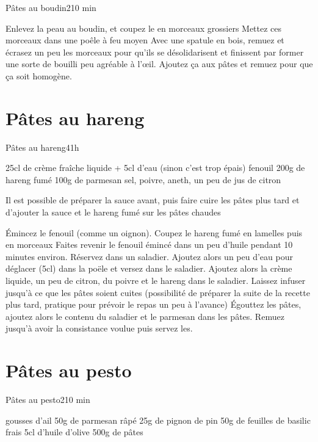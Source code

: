 {\begin{recette}{Pâtes au boudin}{2}{10 min}{}
\begin{preparation}
\etape Enlevez la peau au boudin, et coupez le en morceaux grossiers
\etape Mettez ces morceaux dans une poêle à feu moyen
\etape Avec une spatule en bois, remuez et écrasez un peu les morceaux pour qu'ils se désolidarisent et finissent par former une 
sorte de bouilli peu agréable à l'œil.
\etape Ajoutez ça aux pâtes et remuez pour que ça soit homogène.
\end{preparation}
\end{recette}

\section{Pâtes au hareng}
\begin{recette}{Pâtes au hareng}{4}{1h}{}
\begin{ingredients}
\ingredient 25cl de crème fraîche liquide + 5cl d'eau (sinon c'est trop épais)
 fenouil
\ingredient 200g de hareng fumé
\ingredient 100g de parmesan
\ingredient sel, poivre, aneth, un peu de jus de citron
\end{ingredients}

\begin{remarque}
Il est possible de préparer la sauce avant, puis faire cuire les pâtes plus tard et d'ajouter la sauce et le hareng fumé sur les pâtes chaudes
\end{remarque}


\begin{preparation}
\etape Émincez le fenouil (comme un oignon). Coupez le hareng fumé en lamelles puis en morceaux
\etape Faites revenir le fenouil émincé dans un peu d'huile pendant 10 minutes environ.
\etape Réservez dans un saladier. 
\etape Ajoutez alors un peu d'eau pour déglacer (5cl) dans la poële et versez dans le saladier. 
\etape Ajoutez alors la crème liquide, un peu de citron, du poivre et le hareng dans le saladier. 
\etape Laissez infuser jusqu'à ce que les pâtes soient cuites (possibilité de préparer la suite de la recette plus tard, pratique pour prévoir le repas un peu à l'avance)
\etape Égouttez les pâtes, ajoutez alors le contenu du saladier et le parmesan dans les pâtes. 
\etape Remuez jusqu'à avoir la consistance voulue puis servez les.
\end{preparation}
\end{recette}

\section{Pâtes au pesto}
\begin{recette}{Pâtes au pesto}{2}{10 min}{}
\begin{ingredients}
 gousses d'ail
\ingredient 50g de parmesan râpé
\ingredient 25g de pignon de pin
\ingredient 50g de feuilles de basilic frais
\ingredient 5cl d'huile d'olive
\ingredient 500g de pâtes
\end{ingredients}


\end{recette}}
